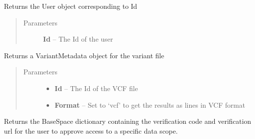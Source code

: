 \documentclass[letterpaper,10pt,english]{sphinxmanual}
\begin{document}
\begin{fulllineitems}
\begin{fulllineitems}
\end{fulllineitems}


\begin{fulllineitems}
\label{Available modules:BaseSpacePy.api.BaseSpaceAPI.BaseSpaceAPI.getUserById}
Returns the User object corresponding to Id
\begin{quote}\begin{description}
\item[{Parameters}] \leavevmode
\textbf{Id} -- The Id of the user

\end{description}\end{quote}

\end{fulllineitems}


\begin{fulllineitems}
\label{Available modules:BaseSpacePy.api.BaseSpaceAPI.BaseSpaceAPI.getVariantMetadata}
Returns a VariantMetadata object for the variant file
\begin{quote}\begin{description}
\item[{Parameters}] \leavevmode\begin{itemize}
\item {} 
\textbf{Id} -- The Id of the VCF file

\item {} 
\textbf{Format} -- Set to `vcf' to get the results as lines in VCF format

\end{itemize}

\end{description}\end{quote}

\end{fulllineitems}


\begin{fulllineitems}
\label{Available modules:BaseSpacePy.api.BaseSpaceAPI.BaseSpaceAPI.getVerificationCode}
Returns the BaseSpace dictionary containing the verification code and verification url for the user to approve
access to a specific data scope.


\end{fulllineitems}
\end{fulllineitems}
\end{document}
